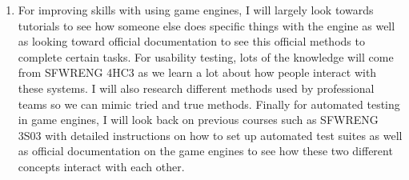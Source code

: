 \documentclass{scrreprt}
\theoremstyle{definition}
\begin{document}
\begin{enumerate}
		\item For improving skills with using game engines, I will largely look towards tutorials to see how someone else does specific things with the engine as well as looking toward official documentation to see this official methods to complete certain tasks. For usability testing, lots of the knowledge will come from SFWRENG 4HC3 as we learn a lot about how people interact with these systems. I will also research different methods used by professional teams so we can mimic tried and true methods. Finally for automated testing in game engines, I will look back on previous courses such as SFWRENG 3S03 with detailed instructions on how to set up automated test suites as well as official documentation on the game engines to see how these two different concepts interact with each other.
	\end{enumerate}
	
	
	
	
\end{document}

